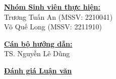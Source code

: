 \documentclass[12pt,a4paper]{article}
\begin{document}
\vspace{0.3cm}

\noindent
\begin{minipage}[t]{0.55\textwidth}
    \underline{\textbf{Nhóm Sinh viên thực hiện:}} \\[0.1cm]
    {\small Trương Tuấn An (MSSV: 2210041)}\\
    {\small Võ Quế Long (MSSV: 2211910)}
\end{minipage}
\hfill
\begin{minipage}[t]{0.4\textwidth}
    \underline{\textbf{Cán bộ hướng dẫn:}} \\[0.1cm]
    {\small TS. Nguyễn Lê Dũng}
\end{minipage}

\vspace{0.4cm}

\noindent \underline{\textbf{Đánh giá Luận văn}}
\end{document}
